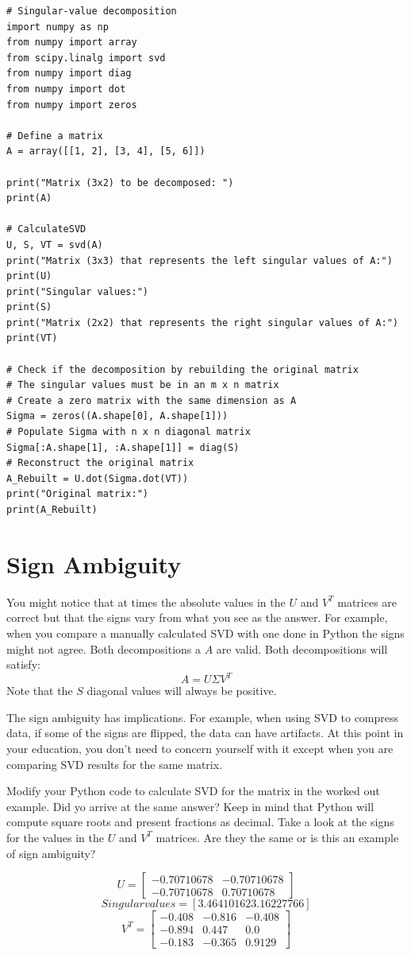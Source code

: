 \begin{Verbatim}
# Singular-value decomposition
import numpy as np
from numpy import array
from scipy.linalg import svd
from numpy import diag
from numpy import dot
from numpy import zeros

# Define a matrix
A = array([[1, 2], [3, 4], [5, 6]])

print("Matrix (3x2) to be decomposed: ")
print(A)

# CalculateSVD
U, S, VT = svd(A)
print("Matrix (3x3) that represents the left singular values of A:")
print(U)
print("Singular values:")
print(S)
print("Matrix (2x2) that represents the right singular values of A:")
print(VT)

# Check if the decomposition by rebuilding the original matrix
# The singular values must be in an m x n matrix 
# Create a zero matrix with the same dimension as A
Sigma = zeros((A.shape[0], A.shape[1]))
# Populate Sigma with n x n diagonal matrix
Sigma[:A.shape[1], :A.shape[1]] = diag(S)
# Reconstruct the original matrix
A_Rebuilt = U.dot(Sigma.dot(VT))
print("Original matrix:")
print(A_Rebuilt)
\end{Verbatim}

\section{Sign Ambiguity}
You might notice that at times the absolute values in the $U$ and $V^T$ matrices are correct but that the signs vary from what you see as the answer. For example, when you compare a manually calculated SVD with one done in Python the signs might not agree. Both decompositions a $A$ are valid. Both decompositions will satisfy:
$$A = U \Sigma V^T$$
Note that the $S$ diagonal values will always be positive. 

The sign ambiguity has implications. For example, when using SVD to compress data, if some of the signs are flipped, the data can have artifacts. At this point in your education, you don't need to concern yourself with it except when you are comparing SVD results for the same matrix.

\begin{Exercise}[title={Single Value Decomposition}, label=svd]
Modify your Python code to calculate SVD for the matrix in the worked out example. Did yo arrive at the same answer? Keep in mind that Python will compute square roots and present fractions as decimal. Take a look at the signs for the values in the $U$ and $V^T$ matrices. Are they the same or is this an example of sign ambiguity? 
\end{Exercise}
\begin{Answer}[ref=svd]
$$U = 
\begin{bmatrix}
-0.70710678 &-0.70710678  \\
 -0.70710678 &0.70710678 
\end{bmatrix}
$$
$$Singular values = [3.46410162 3.16227766]
$$
$$V^T =
\begin{bmatrix}
 -0.408 &-0.816  &-0.408  \\
 -0.894 &0.447 &0.0  \\
 -0.183 &-0.365  &0.9129 
\end{bmatrix}
$$
\end{Answer}

